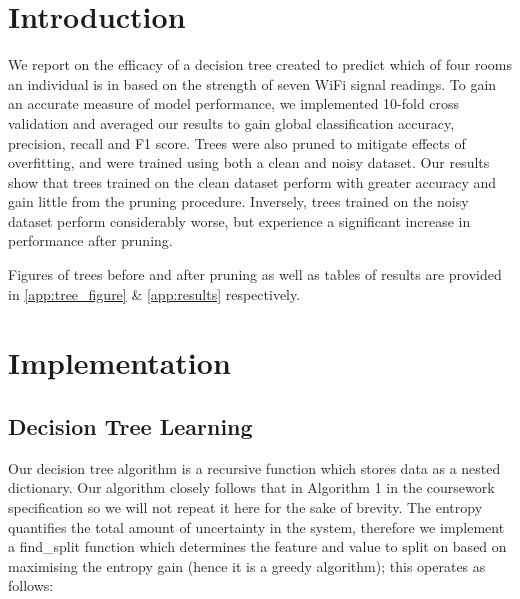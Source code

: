 \documentclass[11pt,twoside]{article}
\begin{document}


\thispagestyle{empty}
\renewcommand{\contentsname}{Table of Contents}
\setcounter{tocdepth}{2}
{\hypersetup{linkcolor=black} %
\tableofcontents
%

%
\listoffigures
\listoftables

}
\newpage

\setcounter{page}{1}
\section{Introduction}
We report on the efficacy of a decision tree created to predict which of four rooms an individual is in based on the strength of seven WiFi signal readings. To gain an accurate measure of model performance, we implemented 10-fold cross validation and averaged our results to gain global classification accuracy, precision, recall and F1 score. Trees were also pruned to mitigate effects of overfitting, and were trained using both a clean and noisy dataset. Our results show that trees trained on the clean dataset perform with greater accuracy and gain little from the pruning procedure. Inversely, trees trained on the noisy dataset perform considerably worse, but experience a significant increase in performance after pruning. 

Figures of trees before and after pruning as well as tables of results are provided in \autoref{app:tree_figure} \& \autoref{app:results} respectively.

\section{Implementation}
\subsection{Decision Tree Learning}
Our decision tree algorithm is a recursive function which stores data as a nested dictionary. Our algorithm closely follows that in Algorithm 1 in the coursework specification so we will not repeat it here for the sake of brevity. The entropy quantifies the total amount of uncertainty in the system, therefore we implement a  find\_split function which determines the feature and value to split on based on maximising the entropy gain (hence it is a greedy algorithm); this operates as follows:
\end{document}
